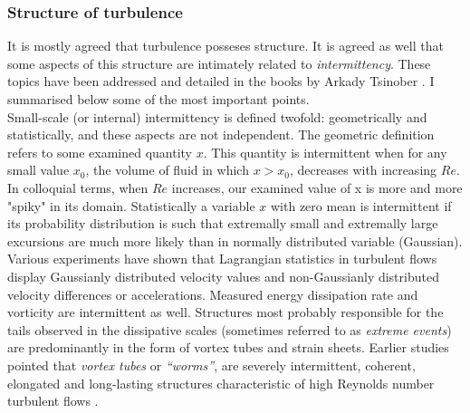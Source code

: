 \documentclass[../main.tex]{subfiles}
\begin{document}
\subsubsection{Structure of turbulence}

It is mostly agreed that turbulence posseses structure. It is agreed as well that some aspects of this structure are intimately related to \emph{intermittency}. These topics have been addressed and detailed in the books by Arkady Tsinober \citep{Tsinober2001, Tsinober2014}. I summarised below some of the most important points.\\
Small-scale (or internal) intermittency is defined twofold: geometrically and statistically, and these aspects are not independent. The geometric definition refers to some examined quantity $x$. This quantity is intermittent when for any small value $x_0$, the volume of fluid in which $x>x_0$, decreases with increasing $Re$. In colloquial terms, when $Re$ increases, our examined value of x is more and more "spiky" in its domain. Statistically a variable $x$ with zero mean is intermittent if its probability distribution is such that extremally small and extremally large excursions are much more likely than in normally distributed variable (Gaussian).\\
Various experiments have shown that Lagrangian statistics in turbulent flows display Gaussianly distributed velocity values and non-Gaussianly distributed velocity differences or accelerations. Measured energy dissipation rate and vorticity are intermittent as well. Structures most probably responsible for the tails observed in the dissipative scales (sometimes referred to as \emph{extreme events}) are predominantly in the form of vortex tubes and strain sheets. Earlier studies pointed that \emph{vortex tubes} or \emph{“worms”}, are severely intermittent, coherent, elongated and long-lasting structures characteristic of high Reynolds number turbulent flows \citep{Mouri2003}. 
\end{document}
